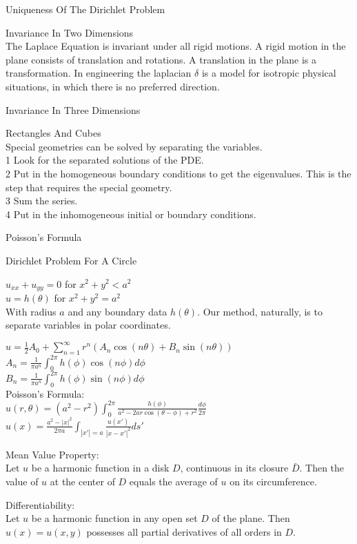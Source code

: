 Uniqueness Of The Dirichlet Problem

Invariance In Two Dimensions \\
The Laplace Equation is invariant under all rigid motions. A rigid motion in the plane consists of translation and rotations. A translation in the plane is a transformation. In engineering the laplacian $\delta$ is a model for isotropic physical situations, in which there is no preferred direction.

Invariance In Three Dimensions

Rectangles And Cubes \\
Special geometries can be solved by separating the variables. \\
1 Look for the separated solutions of the PDE. \\
2 Put in the homogeneous boundary conditions to get the eigenvalues. This is the step that requires the special geometry. \\
3 Sum the series. \\
4 Put in the inhomogeneous initial or boundary conditions.

Poisson's Formula

Dirichlet Problem For A Circle

$u_{xx}+u_{yy}=0$ for $ x^2+y^2<a^2$ \\
$u=h(\theta)$ for $ x^2+y^2=a^2$ \\
With radius $a$ and any boundary data $h(\theta)$. Our method, naturally, is to separate variables in polar coordinates.

$u=\frac{1}{2}A_0+\sum_{n=1}^{\infty}r^n(A_n\cos(n\theta)+B_n\sin(n \theta))$ \\
$A_n=\frac{1}{\pi a^n}\int_0^{2\pi}h(\phi)\cos(n\phi)d\phi$ \\
$B_n=\frac{1}{\pi a^n}\int_0^{2\pi}h(\phi)\sin(n\phi)d\phi$ \\
Poisson's Formula: \\
$u(r,\theta)=(a^2-r^2)\int_0^{2\pi}\frac{h(\phi)}{a^2-2ar\cos(\theta-\phi)+r^2}\frac{d\phi}{2\pi}$ \\
$u(x)=\frac{a^2-|x|^2}{2\pi a}\int_{|x'|=a}\frac{u(x')}{|x-x'|^2}ds'$

Mean Value Property: \\
Let $u$ be a harmonic function in a disk $D$, continuous in its closure $\bar{D}$. Then the value of $u$ at the center of $D$ equals the average of $u$ on its circumference.

Differentiability: \\
Let $u$ be a harmonic function in any open set $D$ of the plane. Then $u(x)=u(x,y)$ possesses all partial derivatives of all orders in $D$.

